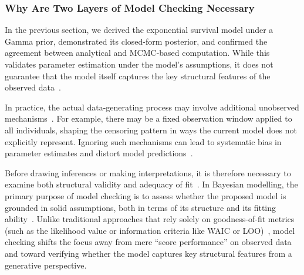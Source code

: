 \subsubsection{Why Are Two Layers of Model Checking Necessary}
\label{subsec:wo Layers of Model Checking}
In the previous section, we derived the exponential survival model under a Gamma prior, demonstrated its closed-form posterior, and confirmed the agreement between analytical and MCMC-based computation. While this validates parameter estimation under the model’s assumptions, it does not guarantee that the model itself captures the key structural features of the observed data~\cite{62bfc978-09b1-3997-9776-380d0b45e9c2, gelman1995bayesian}.

In practice, the actual data-generating process may involve additional unobserved mechanisms~\cite{kalbfleisch2002statistical}. For example, there may be a fixed observation window applied to all individuals, shaping the censoring pattern in ways the current model does not explicitly represent. Ignoring such mechanisms can lead to systematic bias in parameter estimates and distort model predictions~\cite{stats5010006}.

Before drawing inferences or making interpretations, it is therefore necessary to examine both structural validity and adequacy of fit~\cite{62bfc978-09b1-3997-9776-380d0b45e9c2}. In Bayesian modelling, the primary purpose of model checking is to assess whether the proposed model is grounded in solid assumptions, both in terms of its structure and its fitting ability~\cite{https://doi.org/10.1002/ecm.1314}. Unlike traditional approaches that rely solely on goodness-of-fit metrics (such as the likelihood value or information criteria like WAIC or LOO)~\cite{cho2025nonlinear, https://doi.org/10.1002/ecm.1314}, model checking shifts the focus away from mere “score performance” on observed data and toward verifying whether the model captures key structural features from a generative perspective. 

